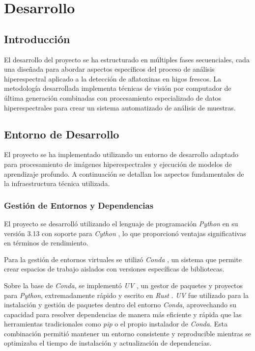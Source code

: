 \chapter{Desarrollo}

\section{Introducción}

El desarrollo del proyecto se ha estructurado en múltiples fases secuenciales, cada una diseñada para abordar aspectos específicos del proceso de análisis hiperespectral aplicado a la detección de aflatoxinas en higos frescos. La metodología desarrollada implementa técnicas de visión por computador de última generación combinadas con procesamiento especializado de datos hiperespectrales para crear un sistema automatizado de análisis de muestras.

\section{Entorno de Desarrollo}

El proyecto se ha implementado utilizando un entorno de desarrollo adaptado para procesamiento de imágenes hiperespectrales y ejecución de modelos de aprendizaje profundo. A continuación se detallan los aspectos fundamentales de la infraestructura técnica utilizada.

\subsection{Gestión de Entornos y Dependencias}

El proyecto se desarrolló utilizando el lenguaje de programación \emph{Python} \cite{van1995python} en su versión 3.13 con soporte para \emph{Cython} \cite{behnel2011cython}, lo que proporcionó ventajas significativas en términos de rendimiento.

\vspace{5mm}

Para la gestión de entornos virtuales se utilizó \emph{Conda} \cite{anaconda}, un sistema que permite crear espacios de trabajo aislados con versiones específicas de bibliotecas.
\vspace{5mm}

Sobre la base de \emph{Conda}, se implementó \emph{UV} \cite{uv2024github}, un gestor de paquetes y proyectos para \emph{Python}, extremadamente rápido y escrito en \emph{Rust} \cite{matsakis2014rust}. \emph{UV} fue utilizado para la instalación y gestión de paquetes dentro del entorno \emph{Conda}, aprovechando su capacidad para resolver dependencias de manera más eficiente y rápida que las herramientas tradicionales como \emph{pip} o el propio instalador de \emph{Conda}. Esta combinación permitió mantener un entorno consistente y reproducible mientras se optimizaba el tiempo de instalación y actualización de dependencias.

